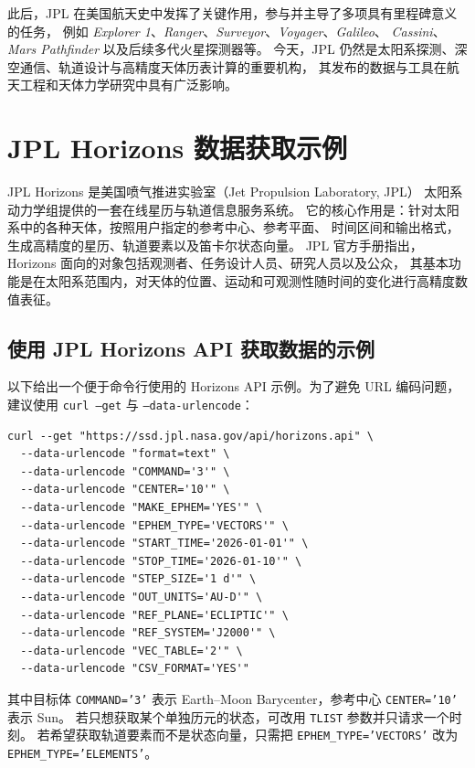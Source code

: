 此后，JPL 在美国航天史中发挥了关键作用，参与并主导了多项具有里程碑意义的任务，
例如 \emph{Explorer 1}、\emph{Ranger}、\emph{Surveyor}、\emph{Voyager}、\emph{Galileo}、
\emph{Cassini}、\emph{Mars Pathfinder} 以及后续多代火星探测器等。
今天，JPL 仍然是太阳系探测、深空通信、轨道设计与高精度天体历表计算的重要机构，
其发布的数据与工具在航天工程和天体力学研究中具有广泛影响。

\chapter{JPL Horizons 数据获取示例}

JPL Horizons 是美国喷气推进实验室（Jet Propulsion Laboratory, JPL）
太阳系动力学组提供的一套在线星历与轨道信息服务系统。
它的核心作用是：针对太阳系中的各种天体，按照用户指定的参考中心、参考平面、
时间区间和输出格式，生成高精度的星历、轨道要素以及笛卡尔状态向量。
JPL 官方手册指出，Horizons 面向的对象包括观测者、任务设计人员、研究人员以及公众，
其基本功能是在太阳系范围内，对天体的位置、运动和可观测性随时间的变化进行高精度数值表征。


\section{使用 JPL Horizons API 获取数据的示例}  

以下给出一个便于命令行使用的 Horizons API 示例。为了避免 URL 编码问题，建议使用 \texttt{curl --get} 与 \texttt{--data-urlencode}：

\begin{verbatim}
curl --get "https://ssd.jpl.nasa.gov/api/horizons.api" \
  --data-urlencode "format=text" \
  --data-urlencode "COMMAND='3'" \
  --data-urlencode "CENTER='10'" \
  --data-urlencode "MAKE_EPHEM='YES'" \
  --data-urlencode "EPHEM_TYPE='VECTORS'" \
  --data-urlencode "START_TIME='2026-01-01'" \
  --data-urlencode "STOP_TIME='2026-01-10'" \
  --data-urlencode "STEP_SIZE='1 d'" \
  --data-urlencode "OUT_UNITS='AU-D'" \
  --data-urlencode "REF_PLANE='ECLIPTIC'" \
  --data-urlencode "REF_SYSTEM='J2000'" \
  --data-urlencode "VEC_TABLE='2'" \
  --data-urlencode "CSV_FORMAT='YES'"
\end{verbatim}

其中目标体 \texttt{COMMAND='3'} 表示 Earth--Moon Barycenter，参考中心 \texttt{CENTER='10'} 表示 Sun。
若只想获取某个单独历元的状态，可改用 \texttt{TLIST} 参数并只请求一个时刻。
若希望获取轨道要素而不是状态向量，只需把 \texttt{EPHEM\_TYPE='VECTORS'} 
改为 \texttt{EPHEM\_TYPE='ELEMENTS'}。

